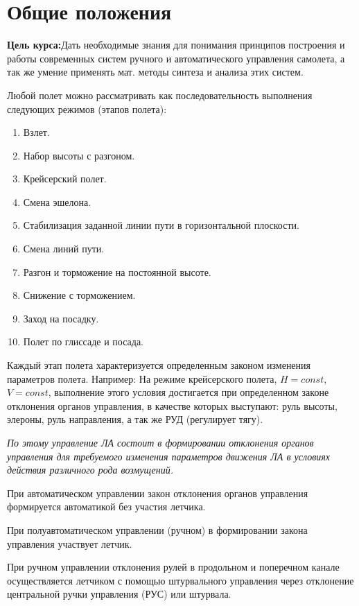 \documentclass{article}
\begin{document}
\thispagestyle{empty}
\tableofcontents
\thispagestyle{empty}
\newpage
\section{Общие положения}
\textbf{Цель курса:}Дать необходимые знания для понимания принципов построения
и работы современных систем ручного и автоматического управления самолета, а
так же умение применять мат. методы синтеза и анализа этих систем.

Любой полет можно рассматривать как последовательность выполнения следующих
режимов (этапов полета): \begin{enumerate}
	\item Взлет.
	\item Набор высоты с разгоном.
	\item Крейсерский полет.
	\item Смена эшелона.
	\item Стабилизация заданной линии пути в горизонтальной плоскости.
	\item Смена линий пути.
	\item Разгон и торможение на постоянной высоте.
	\item Снижение с торможением.
	\item Заход на посадку.
	\item Полет по глиссаде и посада.
\end{enumerate}

Каждый этап полета характеризуется определенным законом изменения параметров
полета. Например: На режиме крейсерского полета, $H=const$, $V=const$,
выполнение этого условия достигается при определенном законе отклонения органов
управления, в качестве которых выступают: руль высоты, элероны, руль
направления, а так же РУД (регулирует тягу).
\begin{flushright}
	\textit{
		По этому управление ЛА состоит в формировании отклонения органов
		управления для требуемого изменения параметров движения ЛА в условиях
		действия различного рода возмущений.}
\end{flushright}

При автоматическом управлении закон отклонения органов управления формируется
автоматикой без участия летчика.

При полуавтоматическом управлении (ручном) в формировании закона управления
участвует летчик.

При ручном управлении отклонения рулей в продольном и поперечном канале
осуществляется летчиком с помощью штурвального управления через отклонение
центральной ручки управления (РУС) или штурвала.
\end{document}
